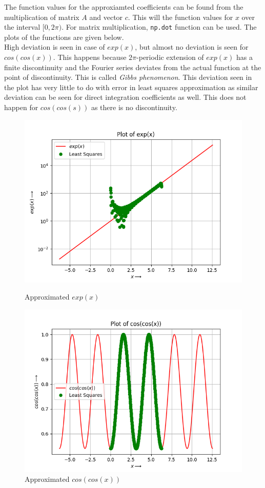 \documentclass[12pt, a4paper]{article}
\begin{document}
The function values for the approxiamted coefficients can be found from the multiplication of matrix $A$ and vector $c$. This will the function values for $x$ over the interval $[0,2\pi)$. For matrix multiplication, \texttt{np.dot} function can be used. The plots of the functions are given below. 
\\ 
High deviation is seen in case of $exp(x)$, but almost no deviation is seen for $cos(cos(x))$. This happens because $2\pi$-periodic extension of $exp(x)$ has a finite discontinuity and the Fourier series deviates from the actual function at the point of discontinuity. This is called \textit{Gibbs phenomenon}. This deviation seen in the plot has very little to do with error in least squares approximation as similar deviation can be seen for direct integration coefficients as well. This does not happen for $cos(cos(s))$ as there is no discontinuity.
\begin{figure}[H]
\centering
\includegraphics[scale=0.75]{Figure_7.png}
\caption{Approximated $exp(x)$}
\centering
\includegraphics[scale=0.75]{Figure_8.png}
\caption{Approximated $cos(cos(x))$}
\end{figure}
\end{document}
